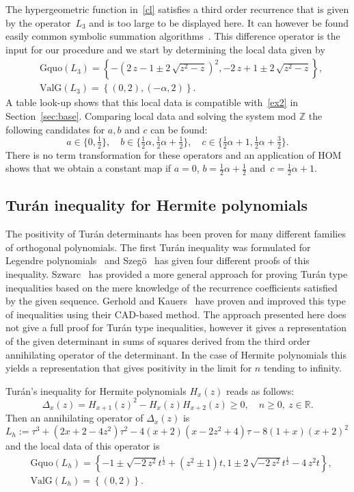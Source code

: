 \documentclass{article}
\newcommand{\Z}{{\mathbb{Z}}} \newcommand{\Q}{{\mathbb{Q}}}
\newcommand{\valg}{\mathrm{ValG}}
\newcommand{\Gq}{\mathrm{Gquo}}
\begin{document}
The hypergeometric function in~\eqref{cl} satisfies a third order recurrence that is given 
by the operator~$L_3$ and is too large to be displayed here. It can however be found easily
common symbolic summation algorithms~\cite{Zeil90a, ChyzakDM, KoutschHF}. This difference operator
is the input for our procedure and we start by determining the local data given by
\[
\begin{aligned}
&\Gq(L_3)=  \left\{  -\left( 2\,z-1\pm2\,\sqrt {{z}^{2}-z} \right) ^{2},-2\,z+1\pm2\,
\sqrt {{z}^{2}-z} \right\}
,\\
& \valg(L_3)=\left\{ (0, 2),(-\alpha, 2) \right\}.
\end{aligned}
\]
A table look-up shows that this local data is compatible with~\ref{ex2} in Section~\ref{sec:base}. Comparing local data and solving the system mod $\Z$ 
the following candidates for $a,b$ and $c$ can be found:
\[
a\in\{0,\tfrac12\},\quad b \in \{\tfrac12 \alpha, \tfrac12 \alpha+\tfrac12\},\quad c \in \{\tfrac12 \alpha+1, \tfrac12\alpha+\tfrac32 \}.
\]
There is no term transformation for these operators and an application of HOM shows that we obtain a constant map if $a=0$, $b=\frac12
\alpha+\frac12$ and~$c=\frac12 \alpha+1$.

\noindent 



\subsection{Tur\'{a}n inequality for Hermite polynomials}
\label{turan}
The positivity of Tur\'{a}n determinants has been proven for many different families of
orthogonal polynomials. The first Tur\'{a}n inequality was formulated for Legendre
polynomials~\cite{TP50} and Szeg\"o~\cite{SG48} has given four different proofs of this
inequality.  Szwarc~\cite{Szwarc} has provided a more general approach for proving
Tur\'{a}n type inequalities based on the mere knowledge of the recurrence coefficients
satisfied by the given sequence. Gerhold and Kauers~\cite{MKTuran} have proven and
improved this type of inequalities using their CAD-based method. The approach presented
here does not give a full proof for Tur\'{a}n type inequalities, however it gives a
representation of the given determinant in sums of squares derived from the third order
annihilating operator of the determinant. In the case of Hermite polynomials this yields a
representation that gives positivity in the limit for $n$ tending to infinity.

Tur\'{a}n's inequality for Hermite polynomials $H_x(z)$ reads as follows:
\[
\Delta_x(z)=H_{x+1}(z)^2- H_{x}(z)H_{x+2}(z) \ge 0,\quad n\ge0,\ z\in\mathbb{R}.
\]
Then an annihilating operator of $\Delta_x(z)$
is $L_h:=\tau^3+(2x+2-4z^2)\tau^2-4(x+2)(x-2z^2+4)\tau-8(1+x)(x+2)^2$ and the local
data of this operator is
\[
\begin{aligned}
&\Gq(L_h)=  \left\{ -1\pm\sqrt {-2\,{z}^{2}}t^\frac12+ \left( {z}^{2}\pm1 \right) t,
1\pm2\,\sqrt {-2\,{z}^{2}}t^\frac12-4\,{z}^{2}t \right\} 
,\\
& \valg(L_h)=\left\{ (0, 2) \right\}.
\end{aligned}
\]
\end{document}

